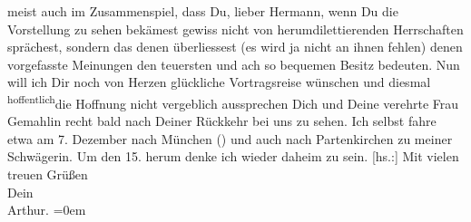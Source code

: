 \begin{ledgroupsized}[t]{13cm}
               meist auch im Zusammenspiel, dass Du, lieber Hermann, wenn Du die Vorstellung zu
               sehen bekämest gewiss nicht von herumdilettierenden Herrschaften sprächest, sondern
               das denen überliessest (es wird ja nicht an ihnen fehlen) denen vorgefasste Meinungen
               den teuersten und ach so bequemen Besitz bedeuten.\pend
           \pstart
           Nun will ich Dir noch von Herzen glückliche Vortragsreise wünschen und  diesmal \substVorne{}\textsuperscript{hoffentlich}{\allowbreak}\substDazwischen{}die Hoffnung\substHinten{} nicht vergeblich aussprechen Dich
               und Deine verehrte Frau Gemahlin recht bald nach Deiner Rückkehr bei uns zu sehen. Ich selbst fahre
               etwa am 7. Dezember nach München (\label{K_L01981_5v}\label{K_L01981_5h}) und
               auch nach Partenkirchen zu meiner Schwägerin. Um den 15. herum denke ich wieder daheim zu sein.\pend
           \pstart
           {[}hs.:{]} Mit vielen treuen Grüßen{\\[\baselineskip]}Dein{\\[\baselineskip]}\spacefill\mbox{Arthur.}\pend
           \leftskip=0em{}          \endnumbering{}\end{ledgroupsized}  \newcommand{\dateiname}{L01981}\newcommand{\titel}{Arthur Schnitzler an Hermann Bahr, 17. 11. 1910}\newcommand{\editorInnen}{ Kurt Ifkovits,  Martin Anton Müller}
            \footnotesize
\begin{ledgroupsized}[t]{11.5cm}
\end{ledgroupsized}
         
      